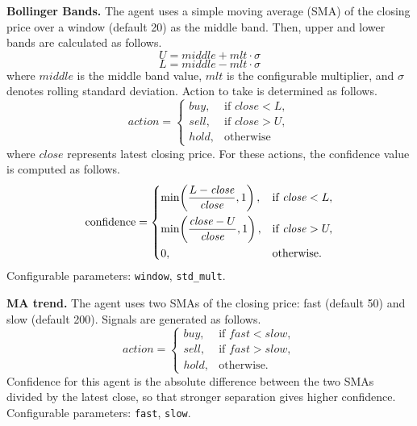 \documentclass{icis}
\begin{document}
\textbf{Bollinger Bands.} The agent uses a simple moving average (SMA) of the closing price over a window (default 20) as the middle band. Then, upper and lower bands are calculated as follows.
\begin{equation}
    U =
    middle + mlt \cdot \sigma
\end{equation}
\begin{equation}
    L =
    middle - mlt \cdot \sigma
\end{equation}
where $middle$ is the middle band value, $mlt$ is the configurable multiplier, and $\sigma$ denotes rolling standard deviation. Action to take is determined as follows.
\begin{equation}
    action =
    \begin{cases}
        buy, & \text{if } close < L, \\
        sell, & \text{if } close > U, \\
        hold, & \text{otherwise}
    \end{cases}
\end{equation}
where $close$ represents latest closing price. For these actions, the confidence value is computed as follows.
\begin{equation}
\mathrm{confidence} =
\begin{dcases}
\min\!\left( \dfrac{L - \mathit{close}}{\mathit{close}}, 1 \right), & \text{if } \mathit{close} < L, \\
\min\!\left( \dfrac{\mathit{close} - U}{\mathit{close}}, 1 \right), & \text{if } \mathit{close} > U, \\
0, & \text{otherwise.}
\end{dcases}
\end{equation}
Configurable parameters: \texttt{window}, \texttt{std\_mult}.

\textbf{MA trend.} The agent uses two SMAs of the closing price: fast (default 50) and slow (default 200). Signals are generated as follows.
\begin{equation}
    action =
    \begin{cases}
        buy, & \text{if } fast < slow, \\
        sell, & \text{if } fast > slow, \\
        hold, & \text{otherwise.}
    \end{cases}
\end{equation}
Confidence for this agent is the absolute difference between the two SMAs divided by the latest close, so that stronger separation gives higher confidence. Configurable parameters: \texttt{fast}, \texttt{slow}.
\end{document}
